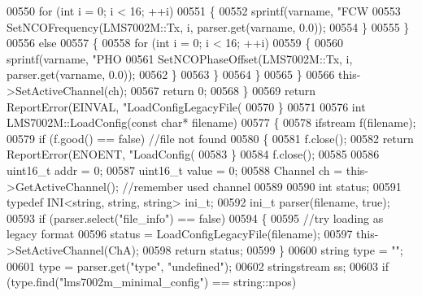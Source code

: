 \begin{DoxyCode}
{{{{{{{{{{{{00550                     \textcolor{keywordflow}{for} (\textcolor{keywordtype}{int} i = 0; i < 16; ++i)
00551                     \{
00552                         sprintf(varname, \textcolor{stringliteral}{"FCW%
00553                         SetNCOFrequency(LMS7002M::Tx, i, parser.get(varname, 0.0));
00554                     \}
00555                 \}
00556                 \textcolor{keywordflow}{else}
00557                 \{
00558                     \textcolor{keywordflow}{for} (\textcolor{keywordtype}{int} i = 0; i < 16; ++i)
00559                     \{
00560                         sprintf(varname, \textcolor{stringliteral}{"PHO%
00561                         SetNCOPhaseOffset(LMS7002M::Tx, i, parser.get(varname, 0.0));
00562                     \}
00563                 \}
00564             \}
00565         \}
00566         this->SetActiveChannel(ch);
00567         \textcolor{keywordflow}{return} 0;
00568     \}
00569     \textcolor{keywordflow}{return} ReportError(EINVAL, \textcolor{stringliteral}{"LoadConfigLegacyFile(%
00570 \}
00571 
00576 \textcolor{keywordtype}{int} LMS7002M::LoadConfig(\textcolor{keyword}{const} \textcolor{keywordtype}{char}* filename)
00577 \{
00578     ifstream f(filename);
00579     \textcolor{keywordflow}{if} (f.good() == \textcolor{keyword}{false}) \textcolor{comment}{//file not found}
00580     \{
00581         f.close();
00582         \textcolor{keywordflow}{return} ReportError(ENOENT, \textcolor{stringliteral}{"LoadConfig(%
00583     \}
00584     f.close();
00585 
00586     uint16\_t addr = 0;
00587     uint16\_t value = 0;
00588     Channel ch = this->GetActiveChannel(); \textcolor{comment}{//remember used channel}
00589 
00590     \textcolor{keywordtype}{int} status;
00591     \textcolor{keyword}{typedef} INI<string, string, string> ini\_t;
00592     ini\_t parser(filename, \textcolor{keyword}{true});
00593     \textcolor{keywordflow}{if} (parser.select(\textcolor{stringliteral}{"file\_info"}) == \textcolor{keyword}{false})
00594     \{
00595         \textcolor{comment}{//try loading as legacy format}
00596         status = LoadConfigLegacyFile(filename);
00597         this->SetActiveChannel(ChA);
00598         \textcolor{keywordflow}{return} status;
00599     \}
00600     \textcolor{keywordtype}{string} type = \textcolor{stringliteral}{""};
00601     type = parser.get(\textcolor{stringliteral}{"type"}, \textcolor{stringliteral}{"undefined"});
00602     stringstream ss;
00603     \textcolor{keywordflow}{if} (type.find(\textcolor{stringliteral}{"lms7002m\_minimal\_config"}) == string::npos)
}}}}}}}}}}}}}}}}
\end{DoxyCode}
